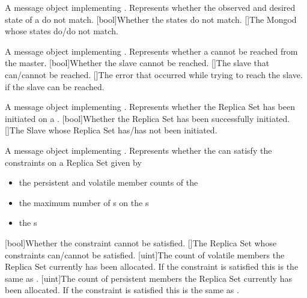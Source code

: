 

{
  A message object implementing .
Represents whether the observed and desired state of a  do not match.
}{
  [bool]{Whether the states do not match.}
  []{The Mongod whose states do/do not match.}
}

{
  A message object implementing .
Represents whether a  cannot be reached from the master.
}{
  [bool]{Whether the slave cannot be reached.}
  []{The slave that can/cannot be reached.}
  []{The error that occurred while trying to reach the slave.  if the slave can be reached.}
}

{
  A message object implementing .
Represents whether the Replica Set has been initiated on a .
}{
  [bool]{Whether the Replica Set has been successfully initiated.}
  []{The Slave whose Replica Set has/has not been initiated.}
}

{
  A message object implementing .
  Represents whether the  can satisfy the constraints on a Replica Set given by
  \begin{itemize}
    \item the persistent and volatile member counts of the 
    \item the maximum number of s on the s
    \item the s
  \end{itemize}
}{
  [bool]{Whether the constraint cannot be satisfied.}
  []{The Replica Set whose constraints can/cannot be satisfied.}
  [uint]{The count of volatile members the Replica Set currently has been allocated. If the constraint is satisfied this is the same as .}
  [uint]{The count of persistent members the Replica Set currently has been allocated. If the constraint is satisfied this is the same as .}
}

